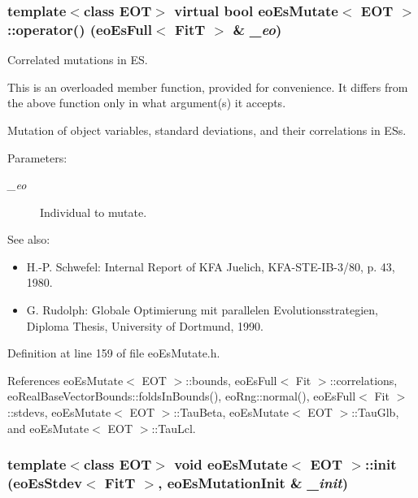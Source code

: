 \subsubsection{\setlength{\rightskip}{0pt plus 5cm}template$<$class EOT$>$ virtual bool {\bf eo\-Es\-Mutate}$<$ {\bf EOT} $>$::operator() ({\bf eo\-Es\-Full}$<$ {\bf Fit\-T} $>$ \& {\em \_\-eo})\hspace{0.3cm}{\tt  [inline, virtual]}}\label{classeo_es_mutate_a5}


Correlated mutations in ES. 

This is an overloaded member function, provided for convenience. It differs from the above function only in what argument(s) it accepts.

Mutation of object variables, standard deviations, and their correlations in ESs.

\begin{Desc}
\item[Parameters:]
\begin{description}
\item[{\em \_\-eo}]Individual to mutate.\end{description}
\end{Desc}
\begin{Desc}
\item[See also:]\begin{itemize}
\item H.-P. Schwefel: Internal Report of KFA Juelich, KFA-STE-IB-3/80, p. 43, 1980.\item G. Rudolph: Globale Optimierung mit parallelen Evolutionsstrategien, Diploma Thesis, University of Dortmund, 1990. \end{itemize}
\end{Desc}


Definition at line 159 of file eo\-Es\-Mutate.h.

References eo\-Es\-Mutate$<$ EOT $>$::bounds, eo\-Es\-Full$<$ Fit $>$::correlations, eo\-Real\-Base\-Vector\-Bounds::folds\-In\-Bounds(), eo\-Rng::normal(), eo\-Es\-Full$<$ Fit $>$::stdevs, eo\-Es\-Mutate$<$ EOT $>$::Tau\-Beta, eo\-Es\-Mutate$<$ EOT $>$::Tau\-Glb, and eo\-Es\-Mutate$<$ EOT $>$::Tau\-Lcl.
\subsubsection{\setlength{\rightskip}{0pt plus 5cm}template$<$class EOT$>$ void {\bf eo\-Es\-Mutate}$<$ {\bf EOT} $>$::init ({\bf eo\-Es\-Stdev}$<$ {\bf Fit\-T} $>$, {\bf eo\-Es\-Mutation\-Init} \& {\em \_\-init})\hspace{0.3cm}{\tt  [inline, private]}}\label{classeo_es_mutate_d1}


